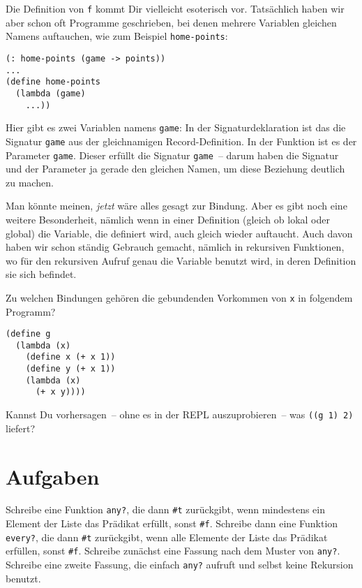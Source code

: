 Die Definition von \lstinline{f} kommt Dir vielleicht esoterisch vor.
Tatsächlich haben wir aber schon oft Programme geschrieben, bei denen
mehrere Variablen gleichen Namens auftauchen, wie zum Beispiel \lstinline{home-points}:

\begin{lstlisting}
(: home-points (game -> points))
...
(define home-points
  (lambda (game)
    ...))
\end{lstlisting}
%
Hier gibt es zwei Variablen namens \lstinline{game}: In der
Signaturdeklaration ist das die Signatur \lstinline{game} aus der
gleichnamigen Record-Definition.  In der Funktion ist es der Parameter
\lstinline{game}.  Dieser erfüllt die Signatur \lstinline{game}~--
darum haben die Signatur und der Parameter ja gerade den gleichen
Namen, um diese Beziehung deutlich zu machen.

Man könnte meinen, \emph{jetzt} wäre alles gesagt zur Bindung.  Aber
es gibt noch eine weitere Besonderheit, nämlich wenn in einer
Definition (gleich ob lokal oder global) die Variable, die definiert
wird, auch gleich wieder auftaucht.  Auch davon haben wir schon
ständig Gebrauch gemacht, nämlich in rekursiven Funktionen, wo für den
rekursiven Aufruf genau die Variable benutzt wird, in deren Definition
sie sich befindet.

\begin{aufgabeinline}
  Zu welchen Bindungen gehören die gebundenden Vorkommen von
  \lstinline{x} in folgendem Programm?
\begin{lstlisting}
(define g
  (lambda (x)
    (define x (+ x 1))
    (define y (+ x 1))
    (lambda (x)
      (+ x y))))
\end{lstlisting}
  Kannst Du vorhersagen~-- ohne es in der REPL auszuprobieren~-- was
  \lstinline{((g 1) 2)} liefert?
\end{aufgabeinline}


\section*{Aufgaben}

\begin{aufgabe}
  Schreibe eine Funktion \lstinline{any?}, die dann \lstinline{#t}
  zurückgibt, wenn mindestens ein Element der Liste das Prädikat
  erfüllt, sonst \lstinline{#f}.  Schreibe dann eine Funktion
  \lstinline{every?}, die dann \lstinline{#t} zurückgibt, wenn alle
  Elemente der Liste das Prädikat erfüllen, sonst \lstinline{#f}.
  Schreibe zunächst eine Fassung nach dem Muster von \lstinline{any?}.
  Schreibe eine zweite Fassung, die einfach \lstinline{any?} aufruft
  und selbst keine Rekursion benutzt.
\end{aufgabe}

